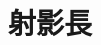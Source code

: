 \documentclass[../../../topic_linear-algebra]{subfiles}
\begin{document}
\sectionline
\section{射影長}

\todo{}
\end{document}
